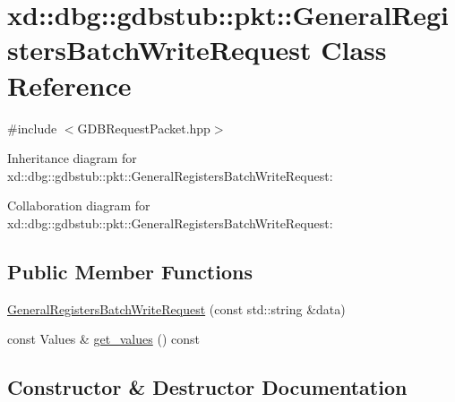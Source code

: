 \hypertarget{classxd_1_1dbg_1_1gdbstub_1_1pkt_1_1_general_registers_batch_write_request}{}\section{xd\+:\+:dbg\+:\+:gdbstub\+:\+:pkt\+:\+:General\+Registers\+Batch\+Write\+Request Class Reference}
\label{classxd_1_1dbg_1_1gdbstub_1_1pkt_1_1_general_registers_batch_write_request}


{\ttfamily \#include $<$G\+D\+B\+Request\+Packet.\+hpp$>$}



Inheritance diagram for xd\+:\+:dbg\+:\+:gdbstub\+:\+:pkt\+:\+:General\+Registers\+Batch\+Write\+Request\+:


Collaboration diagram for xd\+:\+:dbg\+:\+:gdbstub\+:\+:pkt\+:\+:General\+Registers\+Batch\+Write\+Request\+:
\subsection*{Public Member Functions}
\begin{DoxyCompactItemize}
\item 
\mbox{\hyperlink{classxd_1_1dbg_1_1gdbstub_1_1pkt_1_1_general_registers_batch_write_request_ae4e0ef94dc93ceb5bb76d58629fbb26c}{General\+Registers\+Batch\+Write\+Request}} (const std\+::string \&data)
\item 
const Values \& \mbox{\hyperlink{classxd_1_1dbg_1_1gdbstub_1_1pkt_1_1_general_registers_batch_write_request_adb4533712ca08db799da6bf98e215ebf}{get\+\_\+values}} () const
\end{DoxyCompactItemize}


\subsection{Constructor \& Destructor Documentation}
\mbox{\label{classxd_1_1dbg_1_1gdbstub_1_1pkt_1_1_general_registers_batch_write_request_ae4e0ef94dc93ceb5bb76d58629fbb26c}} 
